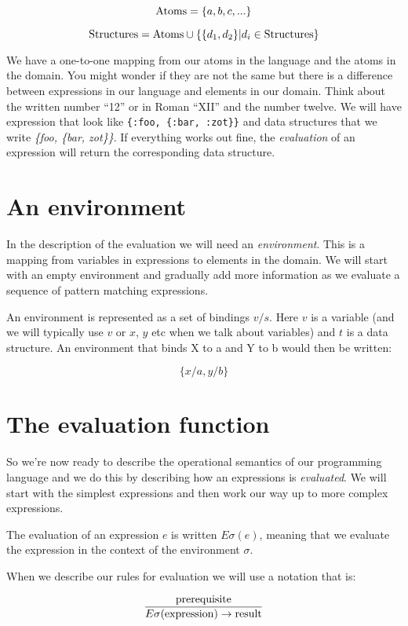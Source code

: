 \documentclass[a4paper,11pt]{article}
\begin{document}
$${\rm Atoms} =  \{a,b,c, ...\}$$

$${\rm Structures} = {\rm Atoms} \cup \{\{d_1, d_2\} | d_i \in {\rm Structures}\}$$

We have a one-to-one mapping from our atoms in the
language and the atoms in the domain. You might wonder if they are not
the same but there is a difference between expressions in our language
and elements in our domain. Think about the written number ``12'' or
in Roman ``XII'' and the number twelve. We will have expression that
look like {\tt \{:foo, \{:bar, :zot\}\}} and data structures that we
write {\em \{foo, \{bar, zot\}\}}. If everything works out fine, the
{\em evaluation} of an expression will return the corresponding data
structure.

\section{An environment}

In the description of the evaluation we will need an {\em
  environment}. This is a mapping from variables in expressions to
elements in the domain. We will start with an empty environment and
gradually add more information as we evaluate a sequence of pattern
matching expressions. 

An environment is represented as a set of bindings $v/s$. Here $v$ is
a variable (and we will typically use $v$ or $x$, $y$ etc when we talk
about variables) and $t$ is a data structure. An environment that
binds X to a and Y to b would then be written:

$$\{x/a, y/b\}$$


\section{The evaluation function}

So we're now ready to describe the operational semantics of our
programming language and we do this by describing how an expressions is
{\em evaluated}. We will start with the simplest expressions and then
work our way up to more complex expressions.

The evaluation of an expression $e$ is written $E\sigma(e)$, meaning
that we evaluate the expression in the context of the environment $\sigma$.

When we describe our rules for evaluation we will use
 a notation that is:

$$\frac{{\rm prerequisite}}{E\sigma({\rm expression}) \rightarrow {\rm result}}$$
\end{document}

